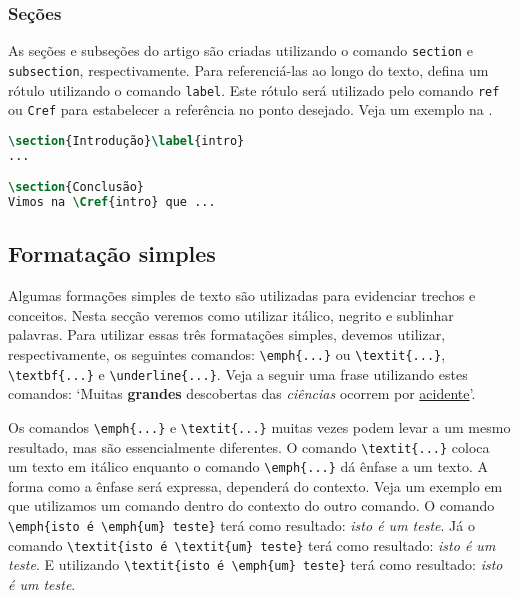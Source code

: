 \documentclass[portuguese]{textolivre}
\begin{document}
\subsubsection{Seções}\label{sec-secoes}
As seções e subseções do artigo são criadas utilizando o comando \verb|section|
e \verb|subsection|, respectivamente. Para referenciá-las ao longo do texto,
defina um rótulo utilizando o comando \verb|label|. Este rótulo será utilizado
pelo comando \verb|ref| ou \verb|Cref| para estabelecer a referência no ponto desejado.
Veja um exemplo na .
\begin{lstlisting}[language=tex, label=lst-seclbl, caption={Seções, subseções e referências.}, source={Elaboracao propria.}]
\section{Introdução}\label{intro}
...

\section{Conclusão}
Vimos na \Cref{intro} que ...
\end{lstlisting} %

\subsection{Formatação simples}\label{sec-format-simple}
Algumas formações simples de texto são utilizadas para evidenciar trechos e conceitos.
Nesta secção veremos como utilizar itálico, negrito e sublinhar palavras.
Para utilizar essas três formatações simples, devemos utilizar, respectivamente, os seguintes
comandos: \verb|\emph{...}| ou \verb|\textit{...}|, \verb|\textbf{...}| e \verb|\underline{...}|.
Veja a seguir uma frase utilizando estes comandos:
`Muitas \textbf{grandes} descobertas das \textit{ciências} ocorrem por \underline{acidente}'.

Os comandos \verb|\emph{...}| e \verb|\textit{...}| muitas vezes podem levar a um mesmo resultado,
mas são essencialmente diferentes. O comando \verb|\textit{...}| coloca um texto em itálico enquanto
o comando \verb|\emph{...}| dá ênfase a um texto. A forma como a ênfase será expressa, dependerá do contexto.
Veja um exemplo em que utilizamos um comando dentro do contexto do outro comando.
O comando \verb|\emph{isto é \emph{um} teste}| terá como resultado: \emph{isto é \emph{um} teste}.
Já o comando \verb|\textit{isto é \textit{um} teste}| terá como resultado: \textit{isto é \textit{um} teste}.
E utilizando \verb|\textit{isto é \emph{um} teste}| terá como resultado: \textit{isto é \emph{um} teste}.
\end{document}
